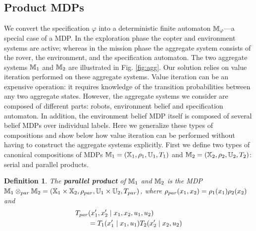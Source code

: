 \documentclass[draft,conference]{IEEEtran}
\newtheorem{definition}{Definition}
\begin{document}
\subsection{Product MDPs}
\label{sub:products}

We convert the specification $\varphi$ into a deterministic finite automaton $\mathbb{M}_\varphi$---a special case of a MDP. In the exploration phase the copter and environment systems are active; whereas in the mission phase the aggregate system consists of the rover, the environment, and the specification automaton. The two aggregate systems $\mathbb{M}_1$ and $\mathbb{M}_2$ are illustrated in Fig. \ref{fig:agg}. Our solution relies on value iteration performed on these aggregate systems. Value iteration can be an expensive operation: it requires knowledge of the transition probabilities between any two aggregate states. However, the aggregate systems we consider are composed of different parts: robots, environment belief and specification automaton. In addition, the environment belief MDP itself is composed of several belief MDPs over individual labels. Here we generalize these types of compositions and show below how value iteration can be performed without having to construct the aggregate systems explicitly. First we define two types of canonical compositions of MDPs $\mathbb{M}_1 = (\mathbb{X}_1, \rho_1, \mathbb{U}_1, T_1)$ and $\mathbb{M}_2 = (\mathbb{X}_2, \rho_2, \mathbb{U}_2, T_2)$: serial and parallel products.
\begin{definition}
  The \textbf{parallel product} of $\mathbb{M}_1$ and $\mathbb{M}_2$ is the MDP $\mathbb{M}_1 \otimes_{par} \mathbb{M}_2 = (\mathbb{X}_1 \times \mathbb{X}_2, \rho_{par}, \mathbb{U}_1 \times \mathbb{U}_2, T_{par})$, where $\rho_{par}(x_1, x_2) = \rho_1(x_1) \rho_2(x_2)$
  and
  \begin{equation}
  \begin{aligned}
      T_{par}&(x_1', x_2' \mid x_1, x_2, u_1, u_2) \\
      & = T_1 (x_1' \mid x_1, u_1) T_2 (x_2' \mid x_2, u_2)
  \end{aligned}
  \end{equation}
\end{definition}
\end{document}
